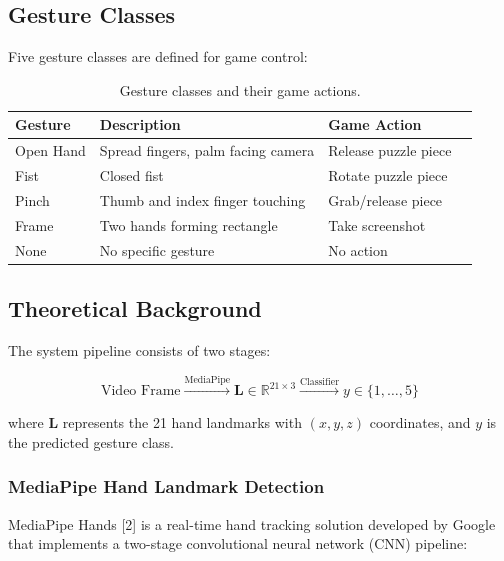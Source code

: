 \documentclass[11pt,a4paper]{article}
\begin{document}
\subsection{Gesture Classes}

Five gesture classes are defined for game control:

\begin{table}[H]
\centering
\caption{Gesture classes and their game actions.}
\label{tab:gestures}
\begin{tabular}{@{}llll@{}}
\toprule
\textbf{Gesture} & \textbf{Description} & \textbf{Game Action} \\
\midrule
Open Hand & Spread fingers, palm facing camera & Release puzzle piece \\
Fist & Closed fist & Rotate puzzle piece \\
Pinch & Thumb and index finger touching & Grab/release piece \\
Frame & Two hands forming rectangle & Take screenshot \\
None & No specific gesture & No action \\
\bottomrule
\end{tabular}
\end{table}

\subsection{Theoretical Background}

The system pipeline consists of two stages:

\begin{equation}
\label{eq:pipeline}
\text{Video Frame} \xrightarrow{\text{MediaPipe}} \mathbf{L} \in \mathbb{R}^{21 \times 3} \xrightarrow{\text{Classifier}} y \in \{1, \ldots, 5\}
\end{equation}

where $\mathbf{L}$ represents the 21 hand landmarks with $(x, y, z)$ coordinates, and $y$ is the predicted gesture class.

\subsubsection{MediaPipe Hand Landmark Detection}

MediaPipe Hands [2] is a real-time hand tracking solution developed by Google that implements a two-stage convolutional neural network (CNN) pipeline:
\end{document}
